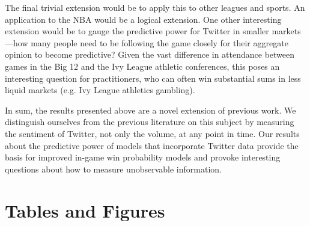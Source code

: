 \documentclass[12pt]{article}
\begin{document}
\begin{doublespacing}
The final trivial extension would be to apply this to other leagues and sports. An application to the NBA would be a logical extension. One other interesting extension would be to gauge the predictive power for Twitter in smaller markets---how many people need to be following the game closely for their aggregate opinion to become predictive? Given the vast difference in attendance between games in the Big 12 and the Ivy League athletic conferences, this poses an interesting question for practitioners, who can often win substantial sums in less liquid markets (e.g. Ivy League athletics gambling).    

In sum, the results presented above are a novel extension of previous work. We distinguish ourselves from the previous literature on this subject by measuring the sentiment of Twitter, not only the volume, at any point in time. Our results about the predictive power of models that incorporate Twitter data provide the basis for improved in-game win probability models and provoke interesting questions about how to measure unobservable information. 

\section{Tables and Figures}


\end{doublespacing}
\end{document}
